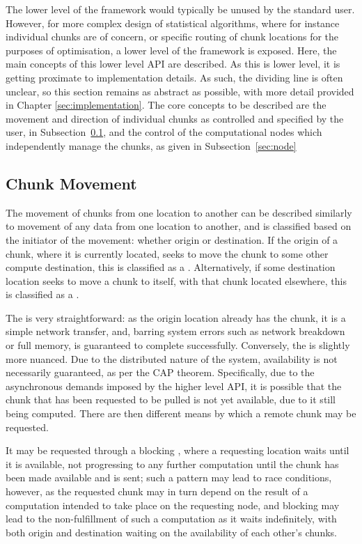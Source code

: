 The lower level of the \lsr framework would typically be unused by the standard user.
However, for more complex design of statistical algorithms, where for instance individual chunks are of concern, or specific routing of chunk locations for the purposes of optimisation, a lower level of the framework is exposed.
Here, the main concepts of this lower level API are described.
As this is lower level, it is getting proximate to implementation details.
As such, the dividing line is often unclear, so this section remains as abstract as possible, with more detail provided in Chapter \cref{sec:implementation}.
The core concepts to be described are the movement and direction of individual chunks as controlled and specified by the user, in Subsection~\cref{sec:cm}, and the control of the computational nodes which independently manage the chunks, as given in Subsection~\cref{sec:node}

\subsection{Chunk Movement}\label{sec:cm}

The movement of chunks from one location to another can be described similarly to movement of any data from one location to another, and is classified based on the initiator of the movement: whether origin or destination.
If the origin of a chunk, where it is currently located, seeks to move the chunk to some other compute destination, this is classified as a .
Alternatively, if some destination location seeks to move a chunk to itself, with that chunk located elsewhere, this is classified as a .

The  is very straightforward: as the origin location already has the chunk, it is a simple network transfer, and, barring system errors such as network breakdown or full memory, is guaranteed to complete successfully.
Conversely, the  is slightly more nuanced.
Due to the distributed nature of the system, availability is not necessarily guaranteed, as per the CAP theorem\cite{gilbert2002brewer}.
Specifically, due to the asynchronous demands imposed by the higher level API, it is possible that the chunk that has been requested to be pulled is not yet available, due to it still being computed.
There are then different means by which a remote chunk may be requested.

It may be requested through a blocking , where a requesting location waits until it is available, not progressing to any further computation until the chunk has been made available and is sent; such a pattern may lead to race conditions, however, as the requested chunk may in turn depend on the result of a computation intended to take place on the requesting node, and blocking may lead to the non-fulfillment of such a computation as it waits indefinitely, with both origin and destination waiting on the availability of each other's chunks.

